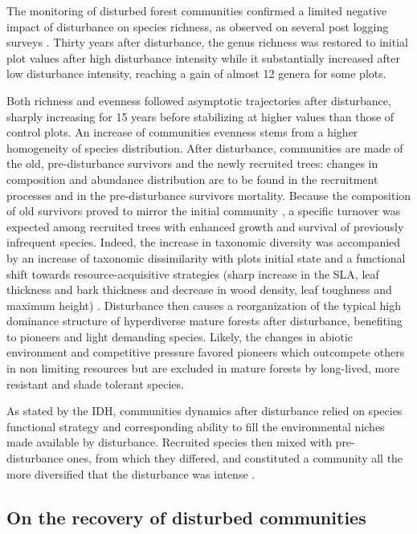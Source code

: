 \documentclass[fleqn,10pt]{ArtEcoFoG} %
\theoremstyle{definition}
\theoremstyle{definition}
\theoremstyle{definition}
\theoremstyle{remark}
\begin{document}
The monitoring of disturbed forest communities confirmed a limited
negative impact of disturbance on species richness, as observed on
several post logging surveys \citep{Cannon1998, Baraloto2012a}. Thirty
years after disturbance, the genus richness was restored to initial plot
values after high disturbance intensity while it substantially increased
after low disturbance intensity, reaching a gain of almost 12 genera for
some plots.

Both richness and evenness followed asymptotic trajectories after
disturbance, sharply increasing for 15 years before stabilizing at
higher values than those of control plots. An increase of communities
evenness stems from a higher homogeneity of species distribution. After
disturbance, communities are made of the old, pre-disturbance survivors
and the newly recruited trees: changes in composition and abundance
distribution are to be found in the recruitment processes and in the
pre-disturbance survivors mortality. Because the composition of old
survivors proved to mirror the initial community \citep{Herault2018}, a
specific turnover was expected among recruited trees with enhanced
growth and survival of previously infrequent species. Indeed, the
increase in taxonomic diversity was accompanied by an increase of
taxonomic dissimilarity with plots initial state and a functional shift
towards resource-acquisitive strategies (sharp increase in the SLA, leaf
thickness and bark thickness and decrease in wood density, leaf
toughness and maximum height)
\citep{Westoby1998, Wright2004, Reich2014}. Disturbance then causes a
reorganization of the typical high dominance structure of hyperdiverse
mature forests after disturbance, benefiting to pioneers and light
demanding species. Likely, the changes in abiotic environment and
competitive pressure favored pioneers which outcompete others in non
limiting resources but are excluded in mature forests by long-lived,
more resistant and shade tolerant species.

As stated by the IDH, communities dynamics after disturbance relied on
species functional strategy and corresponding ability to fill the
environmental niches made available by disturbance. Recruited species
then mixed with pre-disturbance ones, from which they differed, and
constituted a community all the more diversified that the disturbance
was intense \citep{Molino2001}.

\subsection{On the recovery of disturbed
communities}\label{on-the-recovery-of-disturbed-communities}
\end{document}
